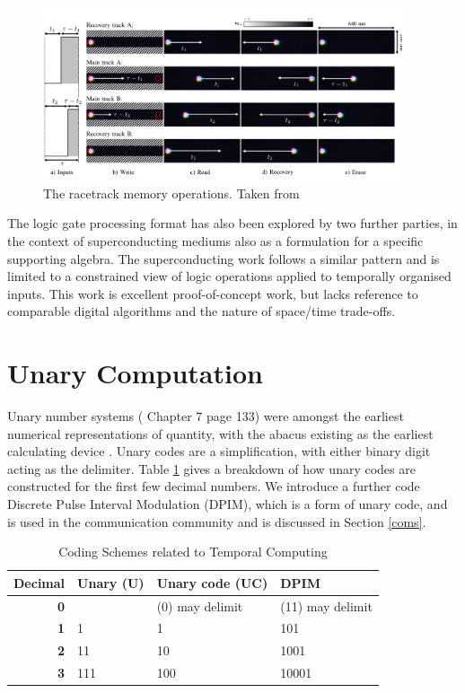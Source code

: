 \documentclass{article}
\begin{document}
\begin{figure}[ht]
  \centering
  \includegraphics[width=300pt]{figures/racetrack.png}
  \caption{The racetrack memory operations. Taken from \cite{vakili2020temporal}}
  \label{fig:racetrack}
\end{figure}

The logic gate processing format has also been explored by two further parties, in the context of superconducting mediums \cite{tzimpragos2019arbitrary} \cite{tzimpragos2021temporal} \cite{tzimpragos2022computing} \cite{volk2023addressable} \cite{segal2022digital} also as a formulation for a specific supporting algebra. The superconducting work follows a similar pattern and is limited to a constrained view of logic operations applied to temporally organised inputs. This work is excellent proof-of-concept work, but lacks reference to comparable digital algorithms and the nature of space/time trade-offs. 

\section{Unary Computation} \label{unary}

Unary number systems (\cite{MacKay:2002:ITI:971143} Chapter 7 page 133) were amongst the earliest numerical representations of quantity, with the abacus existing as the earliest calculating device \cite{POPPELBAUM198747}. Unary codes are a simplification, with either binary digit acting as the delimiter. Table \ref{mem1} gives a breakdown of how unary codes are constructed for the first few decimal numbers. We introduce a further code Discrete Pulse Interval Modulation (DPIM), which is a form of unary code, and is used in the communication community and is discussed in Section \ref{coms}.

\begin{table}[ht]
  \begin{center}
    \begin{tabular}{rlll} \hline
      \textbf{Decimal} & Unary (U) & Unary code (UC) & DPIM \\\hline
      \textbf{0}    &    & (0) may delimit & (11) may delimit \\
      \textbf{1}    & 1   & 1        & 101\\
      \textbf{2}    & 11  & 10        & 1001\\
      \textbf{3}    & 111  & 100       & 10001\\ \hline
    \end{tabular}
  \end{center}
  \caption{Coding Schemes related to Temporal Computing}\label{mem1}
\end{table}
\end{document}
